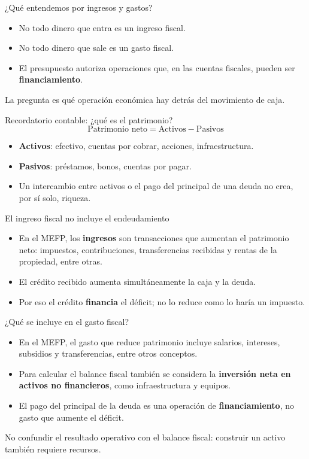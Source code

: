 \begin{frame}{¿Qué entendemos por ingresos y gastos?}
\begin{itemize}
  \item No todo dinero que entra es un ingreso fiscal.
  \item No todo dinero que sale es un gasto fiscal.
  \item El presupuesto autoriza operaciones que, en las cuentas fiscales, pueden ser \textbf{financiamiento}.
\end{itemize}
\vspace{1em}
La pregunta es qué operación económica hay detrás del movimiento de caja.
\fuenteFMI
\end{frame}

\begin{frame}{Recordatorio contable: ¿qué es el patrimonio?}
\[\text{Patrimonio neto}=\text{Activos}-\text{Pasivos}\]
\begin{itemize}
  \item \textbf{Activos}: efectivo, cuentas por cobrar, acciones, infraestructura.
  \item \textbf{Pasivos}: préstamos, bonos, cuentas por pagar.
  \item Un intercambio entre activos o el pago del principal de una deuda no crea, por sí solo, riqueza.
\end{itemize}
\fuenteFMI
\end{frame}

\begin{frame}{El ingreso fiscal no incluye el endeudamiento}
\begin{itemize}
  \item En el MEFP, los \textbf{ingresos} son transacciones que aumentan el patrimonio neto: impuestos, contribuciones, transferencias recibidas y rentas de la propiedad, entre otras.
  \item El crédito recibido aumenta simultáneamente la caja y la deuda.
  \item Por eso el crédito \textbf{financia} el déficit; no lo reduce como lo haría un impuesto.
\end{itemize}
\fuenteFMI
\end{frame}

\begin{frame}{¿Qué se incluye en el gasto fiscal?}
\begin{itemize}
  \item En el MEFP, el gasto que reduce patrimonio incluye salarios, intereses, subsidios y transferencias, entre otros conceptos.
  \item Para calcular el balance fiscal también se considera la \textbf{inversión neta en activos no financieros}, como infraestructura y equipos.
  \item El pago del principal de la deuda es una operación de \textbf{financiamiento}, no gasto que aumente el déficit.
\end{itemize}
\vspace{0.5em}
\small No confundir el resultado operativo con el balance fiscal: construir un activo también requiere recursos.
\fuenteFMI
\end{frame}

